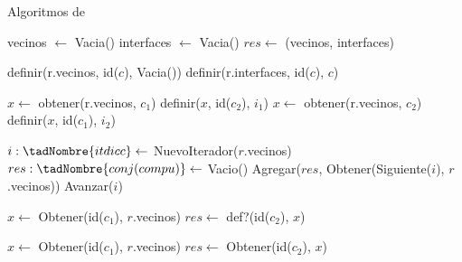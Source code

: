 \begin{Algoritmos}


\begin{algorithm}
  \caption{Algoritmos de }
\begin{algorithmic}[1]
  \State vecinos $\gets$ Vacia()
  \State interfaces $\gets$ Vacia()
  \State $res \gets$ (vecinos, interfaces)
  \EndProcedure
\end{algorithmic}


\begin{algorithmic}[1]
  \State definir(r.vecinos, id($c$), Vacia())
  \State definir(r.interfaces, id($c$), $c$)
 \EndProcedure
\end{algorithmic}




\begin{algorithmic}[1]
  \State $x \gets$ obtener(r.vecinos, $c_1$)
  \State definir($x$, id($c_2$), $i_1$)
  \State $x \gets$ obtener(r.vecinos, $c_2$)
  \State definir($x$, id($c_1$), $i_2$)
 \EndProcedure
\end{algorithmic}




\begin{algorithmic}[1]
  \State $i :\tadNombre{itdicc} \gets$ NuevoIterador($r$.vecinos)
  \State $res :\tadNombre{conj(compu)} \gets$ Vacio()
    \State Agregar($res$, Obtener(Siguiente($i$), $r$.vecinos))
    \State Avanzar($i$)
  \EndWhile
 \EndProcedure
\end{algorithmic}


\begin{algorithmic}[1]
  \State $x \gets$ Obtener(id($c_1$), $r$.vecinos)
  \State $res \gets$ def?(id($c_2$), $x$)
 \EndProcedure
\end{algorithmic}


\begin{algorithmic}[1]
  \State $x \gets$ Obtener(id($c_1$), $r$.vecinos)
  \State $res \gets$ Obtener(id($c_2$), $x$)
 \EndProcedure
\end{algorithmic}



\end{algorithm}
\end{Algoritmos}
